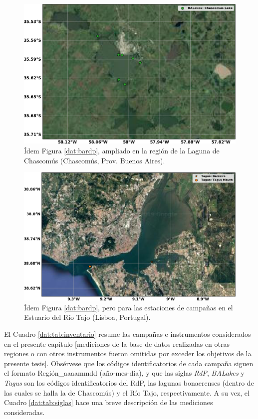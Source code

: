     
    \begin{figure}
    \centering
    \includegraphics[width=\textwidth]{dat/figures/MAP_Chascomus.png}
    \caption[Ubicación de las estaciones de campañas en la región de la Laguna de Chascomús.]{Ídem Figura \ref{dat:bardp}, ampliado en la región de la Laguna de Chascomús (Chascomús, Prov. Buenos Aires).}
    \label{dat:chascomus}
    \end{figure}
    
    \begin{figure}
    \centering
    \includegraphics[width=\textwidth]{dat/figures/MAP_Tagus.png}
    \caption[Ubicación de las estaciones de campañas en la región del Estuario del Río Tajo (Portugal).]{Ídem Figura \ref{dat:bardp}, pero para las estaciones de campañas en el Estuario del Río Tajo (Lisboa, Portugal).}
    \label{dat:tagus}
    \end{figure}
    
    El Cuadro \ref{dat:tab:inventario} resume las campañas e instrumentos considerados en el presente capítulo [mediciones de la base de datos realizadas en otras regiones o con otros instrumentos fueron omitidas por exceder los objetivos de la presente tesis]. Obsérvese que los códigos identificatorios de cada campaña siguen el formato Región\_aaaammdd (año-mes-día), y que las siglas \textit{RdP}, \textit{BALakes} y \textit{Tagus} son los códigos identificatorios del RdP, las lagunas bonaerenses (dentro de las cuales se halla la de Chascomús) y el Río Tajo, respectivamente. A su vez, el Cuadro \ref{dat:tab:siglas} hace una breve descripción de las mediciones consideradas.
    
